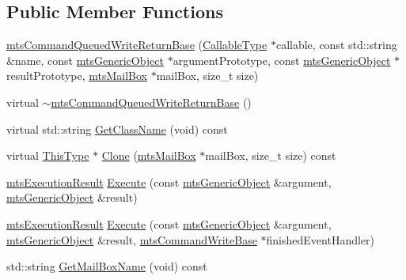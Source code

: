 \subsection*{Public Member Functions}
\begin{DoxyCompactItemize}
\item 
\hyperlink{classmts_command_queued_write_return_base_a972b13c4891a8cc227d8c59062a8d584}{mts\-Command\-Queued\-Write\-Return\-Base} (\hyperlink{classmts_command_queued_write_return_base_aa8635b9bab77a8e15f53f9f80415c420}{Callable\-Type} $\ast$callable, const std\-::string \&name, const \hyperlink{classmts_generic_object}{mts\-Generic\-Object} $\ast$argument\-Prototype, const \hyperlink{classmts_generic_object}{mts\-Generic\-Object} $\ast$result\-Prototype, \hyperlink{classmts_mail_box}{mts\-Mail\-Box} $\ast$mail\-Box, size\-\_\-t size)
\item 
virtual \hyperlink{classmts_command_queued_write_return_base_a73ca5f69553a4d5d8340478c4bfbf2b8}{$\sim$mts\-Command\-Queued\-Write\-Return\-Base} ()
\item 
virtual std\-::string \hyperlink{classmts_command_queued_write_return_base_af935b4426ac0e239aea6ab1dba2499c3}{Get\-Class\-Name} (void) const 
\item 
virtual \hyperlink{classmts_command_queued_write_return_base_af2f07528dc98cd88ab385e995f95a368}{This\-Type} $\ast$ \hyperlink{classmts_command_queued_write_return_base_a7e55f1214273ccfeaf3a32d64dd4b59a}{Clone} (\hyperlink{classmts_mail_box}{mts\-Mail\-Box} $\ast$mail\-Box, size\-\_\-t size) const 
\item 
\hyperlink{classmts_execution_result}{mts\-Execution\-Result} \hyperlink{classmts_command_queued_write_return_base_a9d972591c75d86c91e3b0746c35ff70c}{Execute} (const \hyperlink{classmts_generic_object}{mts\-Generic\-Object} \&argument, \hyperlink{classmts_generic_object}{mts\-Generic\-Object} \&result)
\item 
\hyperlink{classmts_execution_result}{mts\-Execution\-Result} \hyperlink{classmts_command_queued_write_return_base_a0da939240489bc0eee567225598aeb10}{Execute} (const \hyperlink{classmts_generic_object}{mts\-Generic\-Object} \&argument, \hyperlink{classmts_generic_object}{mts\-Generic\-Object} \&result, \hyperlink{classmts_command_write_base}{mts\-Command\-Write\-Base} $\ast$finished\-Event\-Handler)
\item 
std\-::string \hyperlink{classmts_command_queued_write_return_base_ab7ed86a72f83e9f4a8746d199c41670a}{Get\-Mail\-Box\-Name} (void) const 
\item 

\end{DoxyCompactItemize}
